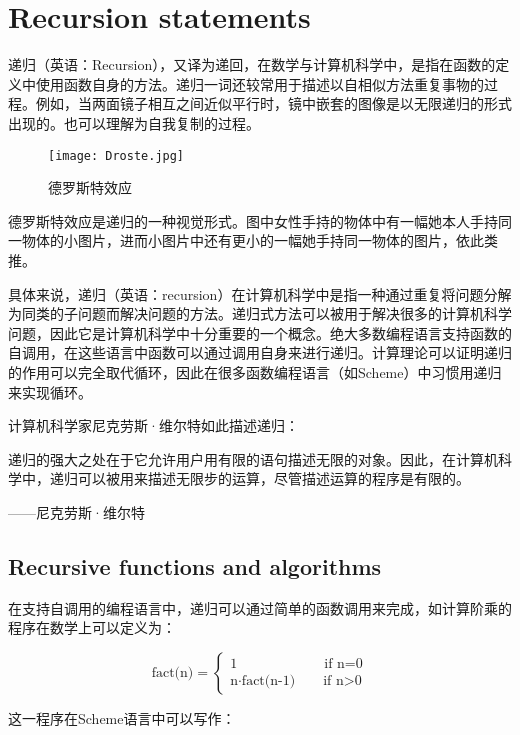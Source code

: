 \chapter{Recursion statements}

递归（英语：Recursion），又译为递回，在数学与计算机科学中，是指在函数的定义中使用函数自身的方法。递归一词还较常用于描述以自相似方法重复事物的过程。例如，当两面镜子相互之间近似平行时，镜中嵌套的图像是以无限递归的形式出现的。也可以理解为自我复制的过程。

\begin{figure}[!h]
\centering
\texttt{[image: Droste.jpg]}
\caption{德罗斯特效应}
\label{Droste}
\end{figure}

德罗斯特效应是递归的一种视觉形式。图中女性手持的物体中有一幅她本人手持同一物体的小图片，进而小图片中还有更小的一幅她手持同一物体的图片，依此类推。


具体来说，递归（英语：recursion）在计算机科学中是指一种通过重复将问题分解为同类的子问题而解决问题的方法。递归式方法可以被用于解决很多的计算机科学问题，因此它是计算机科学中十分重要的一个概念。绝大多数编程语言支持函数的自调用，在这些语言中函数可以通过调用自身来进行递归。计算理论可以证明递归的作用可以完全取代循环，因此在很多函数编程语言（如Scheme）中习惯用递归来实现循环。

计算机科学家尼克劳斯·维尔特如此描述递归：

递归的强大之处在于它允许用户用有限的语句描述无限的对象。因此，在计算机科学中，递归可以被用来描述无限步的运算，尽管描述运算的程序是有限的。

\begin{flushright}
——尼克劳斯·维尔特
\end{flushright}



\section{Recursive functions and algorithms}


在支持自调用的编程语言中，递归可以通过简单的函数调用来完成，如计算阶乘的程序在数学上可以定义为：

\[\text{fact(n)}=\begin{cases}
1	\qquad \qquad \qquad\  \text{if n=0}\\
\text{n}\cdot \text{fact(n-1)} \qquad \text{if n>0}
\end{cases}\]

这一程序在Scheme语言中可以写作：

